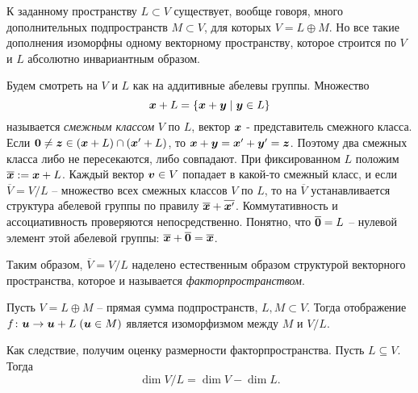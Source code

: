 К заданному пространству $L \subset V$ существует, вообще говоря, много дополнительных подпространств $M \subset V$, для которых $V = L \oplus M$. Но все такие дополнения изоморфны одному векторному пространству, которое строится по $V$ и $L$ абсолютно инвариантным образом.

Будем смотреть на $V$ и $L$ как на аддитивные абелевы группы. Множество
$$
	\mbox{\boldmath $x$} + L = \{\mbox{\boldmath $x$} + \mbox{\boldmath $y$} \mid \mbox{\boldmath $y$} \in L\}
$$
называется \textit{смежным классом} $V$ по $L$, вектор $\mbox{\boldmath $x$}$ - представитель смежного класса. Если $\mbox{\boldmath $0$} \neq \mbox{\boldmath $z$} \in (\mbox{\boldmath $x$} + L) \cap (\mbox{\boldmath $x$} '  + L)$, то $\mbox{\boldmath $x$} + \mbox{\boldmath $y$} = \mbox{\boldmath $x$}' + \mbox{\boldmath $y$}' = \mbox{\boldmath $z$}$. Поэтому два смежных класса либо не пересекаются, либо совпадают. При фиксированном $L$ положим $\overline{\mbox{\boldmath $x$}} := \mbox{\boldmath $x$} + L$. Каждый вектор $\mbox{\boldmath $v$} \in V$ попадает в какой-то смежный класс, и если $\overline{V} = V / L$ -- множество всех смежных классов $V$ по $L$,  то на $\overline{V}$ устанавливается структура абелевой группы по правилу $\overline{\mbox{\boldmath $x$}} + \overline{\mbox{\boldmath $x$}'}$. Коммутативность и ассоциативность проверяются непосредственно. Понятно, что $\overline{\mbox{\boldmath $0$}} = L$ -- нулевой элемент этой абелевой группы: $\overline{\mbox{\boldmath $x$}} + \overline{\mbox{\boldmath $0$}} = \overline{\mbox{\boldmath $x$}}$.

Таким образом, $\overline{V} = V/L$ наделено естественным образом структурой векторного пространства, которое и называется \textit{факторпространством}.


\begin{to_thr} 
	Пусть $V = L \oplus M$ -- прямая сумма подпространств, $L, M \subset V$. Тогда отображение $f\colon \mbox{\boldmath $u$} \to \mbox{\boldmath $u$} + L \; (\mbox{\boldmath $u$} \in M)$ является изоморфизмом между $M$ и $V/L$.  
\end{to_thr}


Как следствие, получим оценку размерности факторпространства. Пусть $L \subseteq V$. Тогда
$$
 	\dim V/L = \dim V - \dim L.
 $$ 

